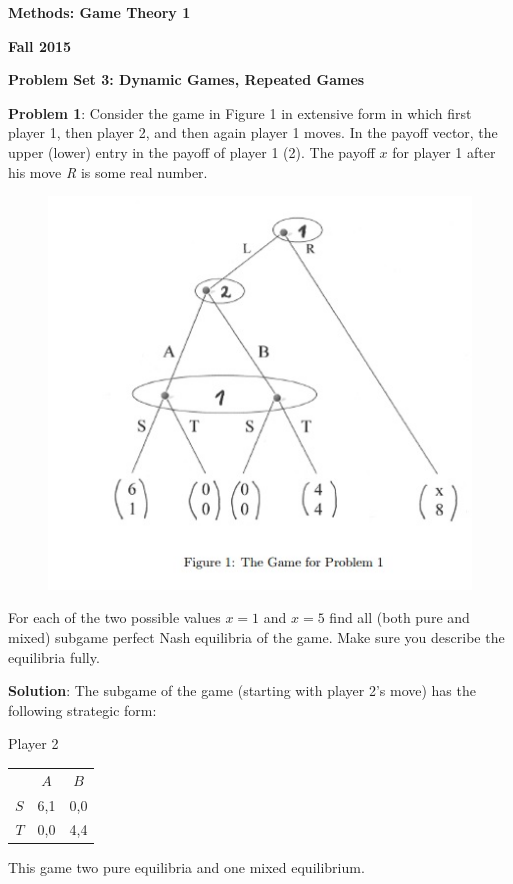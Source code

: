 \documentclass[11pt]{article}
\begin{document}
\begin{center}
\textbf{Methods: Game Theory 1 }
\vspace{3 mm}

\textbf{Fall 2015}
\vspace{7mm}

\textbf{Problem Set 3: Dynamic Games, Repeated Games}
\end{center}

\textbf{Problem 1}: Consider the game in Figure 1 in extensive form in which first player 1, then player 2, and then again player 1 moves. In the payoff vector, the upper (lower) entry in the payoff of player 1 (2). The payoff $x$ for player 1 after his move \textit{R} is some real number.
\begin{figure}[h]
\includegraphics[scale=1]{graph}
\end{figure} For each of the two possible values
$x=1$ and $x=5$ find all (both pure and mixed) subgame perfect Nash equilibria of the game. Make sure you describe the equilibria fully.

\vspace{4mm}
\textbf{Solution}: The subgame of the game (starting with player 2's move) has the following strategic form:

\begin{center}
Player 2
\vspace{5mm}

\begin{tabular}{ r|c|c| }
\multicolumn{1}{r}{}
 & \multicolumn{1}{c}{$A$}
  & \multicolumn{1}{c}{$B$} \\
\cline{2-3}
$S$ & 6,1 & 0,0 \\
\cline{2-3}
$T$ & 0,0 & 4,4 \\
\cline{2-3}

\end{tabular}
\end{center}
\vspace{2mm}
This game two pure equilibria and one mixed equilibrium.
\end{document}
